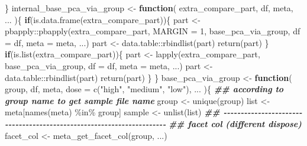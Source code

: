 \documentclass[
]{article}
\newenvironment{Shaded}{\begin{snugshade}}{\end{snugshade}}
\newcommand{\AttributeTok}[1]{\textcolor[rgb]{0.77,0.63,0.00}{#1}}
\newcommand{\ControlFlowTok}[1]{\textcolor[rgb]{0.13,0.29,0.53}{\textbf{#1}}}
\newcommand{\DecValTok}[1]{\textcolor[rgb]{0.00,0.00,0.81}{#1}}
\newcommand{\DocumentationTok}[1]{\textcolor[rgb]{0.56,0.35,0.01}{\textbf{\textit{#1}}}}
\newcommand{\FunctionTok}[1]{\textcolor[rgb]{0.00,0.00,0.00}{#1}}
\newcommand{\NormalTok}[1]{#1}
\newcommand{\OtherTok}[1]{\textcolor[rgb]{0.56,0.35,0.01}{#1}}
\newcommand{\SpecialCharTok}[1]{\textcolor[rgb]{0.00,0.00,0.00}{#1}}
\newcommand{\StringTok}[1]{\textcolor[rgb]{0.31,0.60,0.02}{#1}}
\begin{document}
\begin{Shaded}
\begin{Highlighting}[]
\NormalTok{  \}}
\NormalTok{internal\_base\_pca\_via\_group }\OtherTok{\textless{}{-}} 
  \ControlFlowTok{function}\NormalTok{(}
\NormalTok{           extra\_compare\_part,}
\NormalTok{           df,}
\NormalTok{           meta,}
\NormalTok{           ...}
\NormalTok{           )\{}
    \ControlFlowTok{if}\NormalTok{(}\FunctionTok{is.data.frame}\NormalTok{(extra\_compare\_part))\{}
\NormalTok{      part }\OtherTok{\textless{}{-}}\NormalTok{ pbapply}\SpecialCharTok{::}\FunctionTok{pbapply}\NormalTok{(extra\_compare\_part, }\AttributeTok{MARGIN =} \DecValTok{1}\NormalTok{, base\_pca\_via\_group,}
                               \AttributeTok{df =}\NormalTok{ df, }\AttributeTok{meta =}\NormalTok{ meta, ...)}
\NormalTok{      part }\OtherTok{\textless{}{-}}\NormalTok{ data.table}\SpecialCharTok{::}\FunctionTok{rbindlist}\NormalTok{(part)}
      \FunctionTok{return}\NormalTok{(part)}
\NormalTok{    \}}
    \ControlFlowTok{if}\NormalTok{(}\FunctionTok{is.list}\NormalTok{(extra\_compare\_part))\{}
\NormalTok{      part }\OtherTok{\textless{}{-}} \FunctionTok{lapply}\NormalTok{(extra\_compare\_part, base\_pca\_via\_group,}
                                \AttributeTok{df =}\NormalTok{ df, }\AttributeTok{meta =}\NormalTok{ meta, ...)}
\NormalTok{      part }\OtherTok{\textless{}{-}}\NormalTok{ data.table}\SpecialCharTok{::}\FunctionTok{rbindlist}\NormalTok{(part)}
      \FunctionTok{return}\NormalTok{(part)}
\NormalTok{    \}}
\NormalTok{  \}}
\NormalTok{base\_pca\_via\_group }\OtherTok{\textless{}{-}} 
  \ControlFlowTok{function}\NormalTok{(}
\NormalTok{           group,}
\NormalTok{           df,}
\NormalTok{           meta,}
           \AttributeTok{dose =} \FunctionTok{c}\NormalTok{(}\StringTok{"high"}\NormalTok{, }\StringTok{"medium"}\NormalTok{, }\StringTok{"low"}\NormalTok{),}
\NormalTok{           ...}
\NormalTok{           )\{}
    \DocumentationTok{\#\# according to group name to get sample file name}
\NormalTok{    group }\OtherTok{\textless{}{-}} \FunctionTok{unique}\NormalTok{(group)}
\NormalTok{    list }\OtherTok{\textless{}{-}}\NormalTok{ meta[}\FunctionTok{names}\NormalTok{(meta) }\SpecialCharTok{\%in\%}\NormalTok{ group]}
\NormalTok{    sample }\OtherTok{\textless{}{-}} \FunctionTok{unlist}\NormalTok{(list)}
    \DocumentationTok{\#\# {-}{-}{-}{-}{-}{-}{-}{-}{-}{-}{-}{-}{-}{-}{-}{-}{-}{-}{-}{-}{-}{-}{-}{-}{-}{-}{-}{-}{-}{-}{-}{-}{-}{-}{-}{-}{-}{-}{-}{-}{-}{-}{-}{-}{-}{-}{-}{-}{-}{-}{-}{-}{-}{-}{-}{-}{-}{-}{-}{-}{-}{-}{-}{-}{-}{-}{-}{-}{-}{-} }
    \DocumentationTok{\#\# facet col (different dispose)}
\NormalTok{    facet\_col }\OtherTok{\textless{}{-}} \FunctionTok{meta\_get\_facet\_col}\NormalTok{(group, ...)}

\end{Highlighting}
\end{Shaded}
\end{document}
